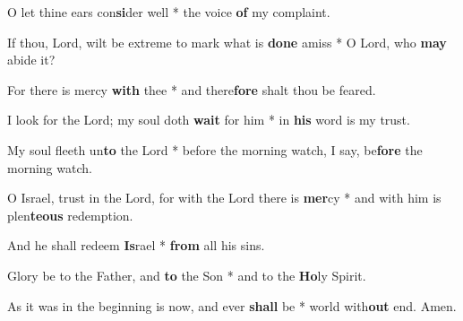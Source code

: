 \begin{multicols}{2}
	O let thine ears con\textbf{si}der well * the voice \textbf{of} my complaint.
	
	If thou, Lord, wilt be extreme to mark what is \textbf{done} amiss * O Lord, who \textbf{may} abide it?
	
	For there is mercy \textbf{with} thee * and there\textbf{fore} shalt thou be feared.
	
	I look for the Lord; my soul doth \textbf{wait} for him * in \textbf{his} word is my trust.
	
	My soul fleeth un\textbf{to} the Lord * before the morning watch, I say, be\textbf{fore} the morning watch.
	
	O Israel, trust in the Lord, for with the Lord there is \textbf{mer}cy * and with him is plen\textbf{teous} redemption.
	
	And he shall redeem \textbf{Is}rael * \textbf{from} all his sins.
	
	Glory be to the Father, and \textbf{to} the Son * and to the \textbf{Ho}ly Spirit.
	
	As it was in the beginning is now, and ever \textbf{shall} be * world with\textbf{out} end. Amen.
\end{multicols}